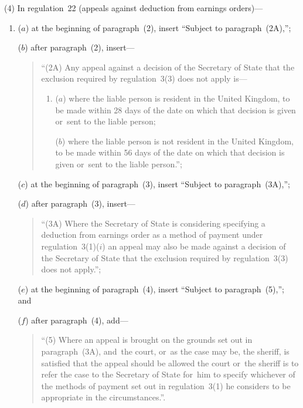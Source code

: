 \documentclass[12pt,a4paper]{article}
\begin{document}
(4) In regulation~22 (appeals against deduction from earnings orders)—
\begin{enumerate}\item[]
\begin{sloppypar}
($a$) at the beginning of paragraph~(2), insert “Subject to paragraph~(2A),”;
\end{sloppypar}

($b$) after paragraph~(2), insert—
\begin{quotation}
“(2A) Any appeal against a decision of the Secretary of State that the exclusion required by regulation~3(3) does not apply is—
\begin{enumerate}\item[]
($a$) where the liable person is resident in the United Kingdom, to be made within 28 days of the date on which that decision is given or~sent to the liable person;

($b$) where the liable person is not resident in the United Kingdom, to be made within 56 days of the date on which that decision is given or~sent to the liable person.”;
\end{enumerate}
\end{quotation}

\begin{sloppypar}
($c$) at the beginning of paragraph~(3), insert “Subject to paragraph~(3A),”;
\end{sloppypar}

($d$) after paragraph~(3), insert—
\begin{quotation}
“(3A) Where the Secretary of State is considering specifying a deduction from earnings order as a method of payment under regulation~3(1)($i$)  an appeal may also be made against a decision of the Secretary of State that the exclusion required by regulation~3(3) does not apply.”;
\end{quotation}

($e$) at the beginning of paragraph~(4), insert “Subject to paragraph~(5),”; and

($f$) after paragraph~(4), add—
\begin{quotation}
“(5) Where an appeal is brought on the grounds set out in paragraph~(3A), and~the court, or~as the case may be, the sheriff, is satisfied that the appeal should be allowed the court or~the sheriff is to refer the case to the Secretary of State for~him to specify whichever of the methods of payment set out in regulation~3(1) he considers to be appropriate in the circumstances.”.
\end{quotation}
\end{enumerate}
\end{document}
